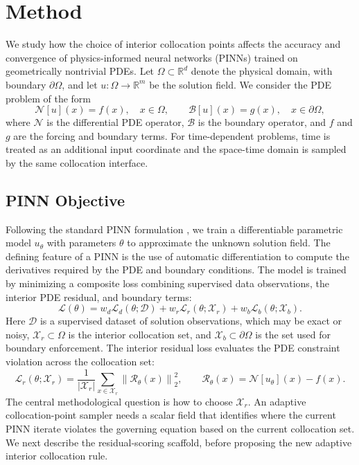 \section{Method}
\label{sec:method}

We study how the choice of interior collocation points affects the accuracy and
convergence of physics-informed neural networks (PINNs) trained on geometrically nontrivial
PDEs.  Let $\Omega \subset \mathbb{R}^d$ denote the physical domain,
with boundary $\partial\Omega$, and let $u:\Omega\rightarrow\mathbb{R}^m$ be the
solution field.  We consider the PDE problem
of the form
\begin{equation}
    \mathcal{N}[u](x) = f(x),
    \quad x\in\Omega,
    \qquad
    \mathcal{B}[u](x) = g(x),
    \quad x\in\partial\Omega,
    \label{eq:pde-general}
\end{equation}
where $\mathcal{N}$ is the differential PDE operator, $\mathcal{B}$ is the boundary
operator, and $f$ and $g$ are the forcing and boundary terms.
For time-dependent problems, time is treated as an additional input coordinate
and the space-time domain is sampled by the same collocation interface.

\subsection{PINN Objective}
\label{subsec:pinn-objective}

Following the standard PINN formulation \cite{raissi2019physics}, we train a
differentiable parametric model $u_\theta$ with parameters $\theta$ to
approximate the unknown solution field.  The defining feature of a PINN is the
use of automatic differentiation to compute the derivatives required by the
PDE and boundary conditions.  The model is trained by minimizing a composite
loss combining supervised data observations, the interior PDE residual, and
boundary terms:
\begin{equation}
    \mathcal{L}(\theta)
    =
    w_d \mathcal{L}_d(\theta;\mathcal{D})
    + w_r \mathcal{L}_r(\theta;\mathcal{X}_r)
    + w_b \mathcal{L}_b(\theta;\mathcal{X}_b).
    \label{eq:pinn-objective}
\end{equation}
Here $\mathcal{D}$ is a supervised dataset of solution observations, which may
be exact or noisy, $\mathcal{X}_r\subset\Omega$ is the interior collocation set, and
$\mathcal{X}_b\subset\partial\Omega$ is the set used for boundary enforcement.
The interior residual loss evaluates
the PDE constraint violation across the collocation set:
\begin{equation}
    \mathcal{L}_r(\theta;\mathcal{X}_r)
    =
    \frac{1}{|\mathcal{X}_r|}
    \sum_{x\in\mathcal{X}_r}
    \left\|
        \mathcal{R}_\theta(x)
    \right\|_2^2,
    \qquad
    \mathcal{R}_\theta (x)
    =
    \mathcal{N}[u_\theta](x)-f(x).
    \label{eq:residual-loss}
\end{equation}
The central methodological question is how to choose $\mathcal{X}_r$. An adaptive collocation-point sampler needs a scalar field that identifies where the current PINN iterate violates the governing equation based on the current collocation set.  We next describe the residual-scoring scaffold, before proposing the new adaptive interior collocation rule.
